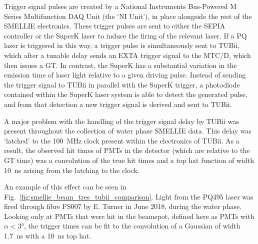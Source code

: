 Trigger signal pulses are created by a National Instruments Bus-Powered M Series Multifunction DAQ Unit (the `NI Unit'), in place alongside the rest of the SMELLIE electronics. These trigger pulses are sent to either the SEPIA controller or the SuperK laser to induce the firing of the relevant laser. If a PQ laser is triggered in this way, a trigger pulse is simultaneously sent to TUBii, which after a tunable delay sends an EXTA trigger signal to the MTC/D, which then issues a GT. In contrast, the SuperK has a substantial variation in the emission time of laser light relative to a given driving pulse. Instead of sending the trigger signal to TUBii in parallel with the SuperK trigger, a photodiode contained within the SuperK laser system is able to detect the generated pulse, and from that detection a new trigger signal is derived and sent to TUBii.

A major problem with the handling of the trigger signal delay by TUBii was present throughout the collection of water phase SMELLIE data. This delay was `latched' to the \SI{100}{\MHz} clock present within the electronics of TUBii. As a result, the observed hit times of PMTs in the detector (which are relative to the GT time) was a convolution of the true hit times and a top hat function of width \SI{10}{\ns} arising from the latching to the clock.

An example of this effect can be seen in Fig.~\ref{fig:smellie_beam_tres_tubii_comparison}. Light from the PQ495 laser was fired through fibre FS007 by E. Turner in June 2018, during the water phase. Looking only at PMTs that were hit in the beamspot, defined here as PMTs with $\alpha<\ang{3}$, the trigger times can be fit to the convolution of a Gaussian of width \SI{1.7}{\ns} with a \SI{10}{\ns} top hat.

